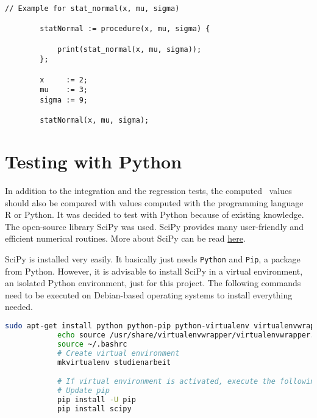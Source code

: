 	\begin{center}
		\begin{lstlisting}[caption={Test File Example}, language={setlx}, label={lis:exampleCode}]
		// Example for stat_normal(x, mu, sigma)

		statNormal := procedure(x, mu, sigma) {

			print(stat_normal(x, mu, sigma));
		};

		x     := 2;
		mu	  := 3;
		sigma := 9;

		statNormal(x, mu, sigma);
		\end{lstlisting}
	\end{center}


\section{Testing with Python}

	In addition to the integration and the regression tests, the computed \setlx\ values should also be compared with values computed with the programming language R or Python. It was decided to test with Python because of existing knowledge. The open-source library \ac{SciPy} was used. \ac{SciPy} provides many user-friendly and efficient numerical routines. More about \ac{SciPy} can be read \href{https://www.scipy.org/}{here}.

	\ac{SciPy} is installed very easily. It basically just needs \lstinline{Python} and \lstinline{Pip}, a package from Python. However, it is advisable to install \ac{SciPy} in a virtual environment, an isolated Python environment, just for this project. The following commands need to be executed on Debian-based operating systems to install everything needed.

	\begin{center}
		\begin{lstlisting}[caption={Install Virtual Environment and SciPy}, language={bash}, label={lis:scipy}]
			sudo apt-get install python python-pip python-virtualenv virtualenvwrapper
			echo source /usr/share/virtualenvwrapper/virtualenvwrapper.sh >> ~/.bashrc
			source ~/.bashrc
			# Create virtual environment
			mkvirtualenv studienarbeit

			# If virtual environment is activated, execute the following:
			# Update pip
			pip install -U pip
			pip install scipy
		\end{lstlisting}
	\end{center}
